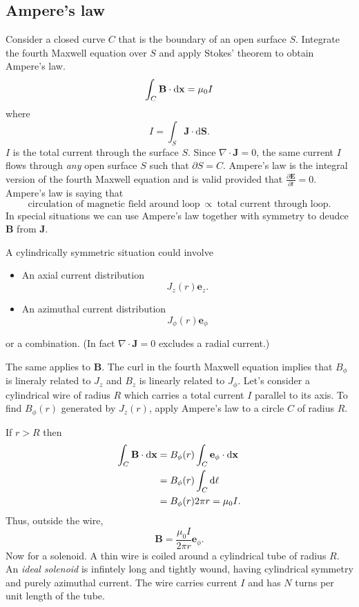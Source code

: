 \documentclass{article}
\begin{document}
\subsection{Ampere's law}
Consider a closed curve $ C $ that is the boundary of an open surface $ S $. Integrate the fourth Maxwell equation over $ S $ and apply Stokes' theorem to obtain Ampere's law.
\[
  \int_C \mathbf B\cdot\mathrm d\mathbf{x} = \mu_0 I
\]
where 
\[
  I = \int_S\mathbf J \cdot\mathrm d\mathbf S.
\]
$ I $ is the total current through the surface $ S $. Since $ \nabla\cdot \mathbf J = 0 $, the same current $ I $ flows through \textit{any} open surface $ S $ such that $ \partial S = C $. Ampere's law is the integral version of the fourth Maxwell equation and is valid provided that $ \frac{\partial \mathbf E}{\partial t} = 0 $. Ampere's law is saying that
\[
	\text{circulation of magnetic field around loop}\ \propto\ \text{total current through loop}.
\]
In special situations we can use Ampere's law together with symmetry to deudce $ \mathbf B $ from $ \mathbf J $.\par
A cylindrically symmetric situation could involve
\begin{itemize}
	\item An axial current distribution
		\[
		  J_z(r) \mathbf e_z.
		\]
	\item An azimuthal current distribution
		\[
		  J_\phi(r)\mathbf e_\phi
		\]
\end{itemize}
or a combination. (In fact $ \nabla\cdot\mathbf J = 0 $ excludes a radial current.)\par
The same applies to $ \mathbf B $. The curl in the fourth Maxwell equation implies that $ B_\phi $ is lineraly related to $ J_z $ and $ B_z $ is linearly related to $ J_\phi $.
Let's consider a cylindrical wire of radius $ R $ which carries a total current $ I $ parallel to its axis. To find $ B_\phi(r) $ generated by $ J_z(r) $, apply Ampere's law to a circle $ C $ of radius $ R $.\par
If $ r>R $ then
\begin{align*}
	\int_C\mathbf B\cdot\mathrm d\mathbf{x} &= B_\phi(r) \int_C \mathbf e_\phi\cdot\mathrm  d\mathbf{x}\\
  &= B_\phi(r)\int_C\mathrm d\ell\\
  &= B_\phi(r) 2\pi r = \mu_0 I.
\end{align*}
Thus, outside the wire,
\[
	\mathbf B = \frac{\mu_0 I}{2\pi r} \mathbf e_\phi.
\]
Now for a solenoid. A thin wire is coiled around a cylindrical tube of radius $ R $. An \textit{ideal solenoid} is infintely long and tightly wound, having cylindrical symmetry and purely azimuthal current. The wire carries current $ I $ and has $ N $ turns per unit length of the tube.
\end{document}
